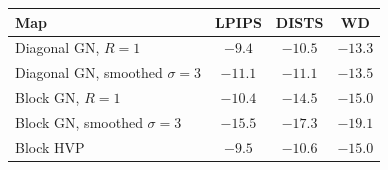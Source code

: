 \begin{tabular}{lccc}
\toprule
Map & LPIPS & DISTS & WD \\
\midrule
Diagonal GN, $R{=}1$ & $-9.4$ & $-10.5$ & $-13.3$ \\
Diagonal GN, smoothed $\sigma{=}3$ & $-11.1$ & $-11.1$ & $-13.5$ \\
Block GN, $R{=}1$ & $-10.4$ & $-14.5$ & $-15.0$ \\
Block GN, smoothed $\sigma{=}3$ & $\mathbf{-15.5}$ & $\mathbf{-17.3}$ & $\mathbf{-19.1}$ \\
Block HVP & $-9.5$ & $-10.6$ & $-15.0$ \\
\bottomrule
\end{tabular}
